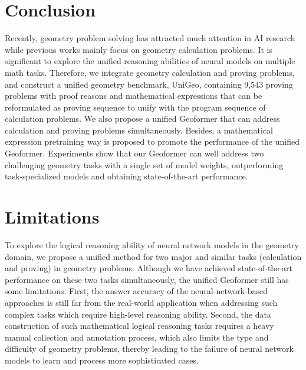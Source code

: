 \documentclass[11pt]{article}
\begin{document}
\section{Conclusion}
Recently, geometry problem solving has attracted much attention in AI research while previous works mainly focus on geometry calculation problems.
It is significant to explore the unified reasoning abilities of neural models on multiple math tasks.
Therefore, we integrate geometry calculation and proving problems, and construct a unified geometry benchmark, UniGeo, containing 9,543 proving problems with proof reasons and mathematical expressions that can be reformulated as proving sequence to unify with the program sequence of calculation problems.
We also propose a unified Geoformer that can address calculation and proving problems simultaneously.
Besides, a mathematical expression pretraining way is proposed to promote the performance of the unified Geoformer. 
Experiments show that our Geoformer can well address two challenging geometry tasks with a single set of model weights, outperforming task-specialized models and obtaining state-of-the-art performance.



\section*{Limitations}


To explore the logical reasoning ability of neural network models in the geometry domain, we propose a unified method for two major and similar tasks (calculation and proving) in geometry problems. Although we have achieved state-of-the-art performance on these two tasks simultaneously, the unified Geoformer still has some limitations.
First, the answer accuracy of the neural-network-based approaches is still far from the real-world application when addressing such complex tasks which require high-level reasoning ability. 
Second, the data construction of such mathematical logical reasoning tasks requires a heavy manual collection and annotation process, which also limits the type and difficulty of geometry problems, thereby leading to the failure of neural network models to learn and process more sophisticated cases.
\end{document}
